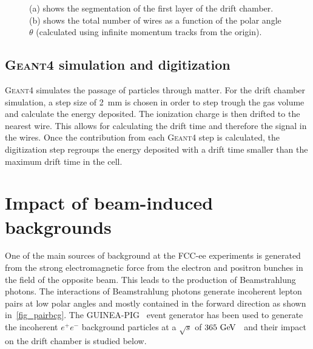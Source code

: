 \documentclass[conference]{IEEEtran}
\begin{document}
\begin{figure}[!t]
\centering
{}
\hfil
{}
\caption{(a) shows the segmentation of the first layer of the drift chamber. (b) shows the total number of wires as a function of the polar angle $\theta$ (calculated using infinite momentum tracks from the origin).}
\label{fig_segmentation}
\end{figure}


\subsection{\textsc{Geant4} simulation and digitization}
\textsc{Geant4} simulates the passage of particles through matter. For the drift chamber simulation, a step size of 2~mm is chosen in order to step trough the gas volume and calculate the energy deposited. The ionization charge is then drifted to the nearest wire. This allows for calculating the drift time and therefore the signal in the wires. Once the contribution from each \textsc{Geant4} step is calculated, the digitization step regroups the energy deposited with a drift time smaller than the maximum drift time in the cell.

\section{Impact of beam-induced backgrounds}
One of the main sources of background at the FCC-ee experiments is generated from the strong electromagnetic force from the electron and positron bunches in the field of the opposite beam. This leads to the production of Beamstrahlung photons. The interactions of Beamstrahlung photons generate incoherent lepton pairs at low polar angles and mostly contained in the forward direction as shown in~\cref{fig_pairbcg}. The \textsc{GUINEA-PIG}~\cite{Schulte:382453} event generator has been used to generate the incoherent $e^+e^-$ background particles at a $\sqrt{s}$ of $365\,\mathrm{\,Ge\kern -0.1em V}$~\cite{Voutsinas:2017eca} and their impact on the drift chamber is studied below.
\end{document}
